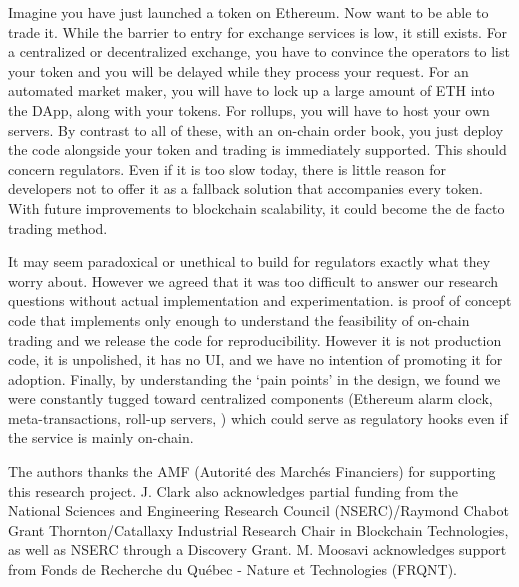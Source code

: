 Imagine you have just launched a token on Ethereum. Now want to be able to trade it. While the barrier to entry for exchange services is low, it still exists. For a centralized or decentralized exchange, you have to convince the operators to list your token and you will be delayed while they process your request. For an automated market maker, you will have to lock up a large amount of ETH into the DApp, along with your tokens. For rollups, you will have to host your own servers. By contrast to all of these, with an on-chain order book, you just deploy the code alongside your token and trading is immediately supported. This should concern regulators. Even if it is too slow today, there is little reason for developers not to offer it as a fallback solution that accompanies every token. With future improvements to blockchain scalability, it could become the de facto trading method. 

It may seem paradoxical or unethical to build for regulators exactly what they worry about. However we agreed that it was too difficult to answer our research questions without actual implementation and experimentation. \cm is proof of concept code that implements only enough to understand the feasibility of on-chain trading and we release the code for reproducibility. However it is not production code, it is unpolished, it has no UI, and we have no intention of promoting it for adoption. Finally, by understanding the `pain points' in the design, we found we were constantly tugged toward centralized components (Ethereum alarm clock, meta-transactions, roll-up servers, \etc) which could serve as regulatory hooks even if the service is mainly on-chain.
 
 
 
\begin{acks} 
The authors thanks the AMF (Autorité des Marchés Financiers) for supporting this research project. J. Clark also acknowledges partial funding from the National Sciences and Engineering Research Council (NSERC)/Raymond Chabot Grant Thornton/Catallaxy Industrial Research Chair in Blockchain Technologies, as well as NSERC through a Discovery Grant. M. Moosavi acknowledges support from Fonds de Recherche du Québec - Nature et Technologies (FRQNT).
\end{acks}

























